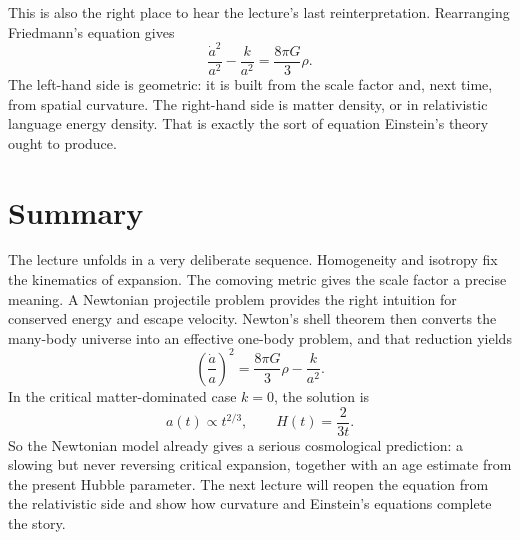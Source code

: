 This is also the right place to hear the lecture's last reinterpretation. Rearranging Friedmann's equation gives
\begin{equation}
\frac{\dot a^2}{a^2}-\frac{k}{a^2}=\frac{8\pi G}{3}\rho.
\end{equation}
The left-hand side is geometric: it is built from the scale factor and, next time, from spatial curvature. The right-hand side is matter density, or in relativistic language energy density. That is exactly the sort of equation Einstein's theory ought to produce.

\section{Summary}

The lecture unfolds in a very deliberate sequence. Homogeneity and isotropy fix the kinematics of expansion. The comoving metric gives the scale factor a precise meaning. A Newtonian projectile problem provides the right intuition for conserved energy and escape velocity. Newton's shell theorem then converts the many-body universe into an effective one-body problem, and that reduction yields
\begin{equation}
\left(\frac{\dot a}{a}\right)^2=\frac{8\pi G}{3}\rho-\frac{k}{a^2}.
\end{equation}
In the critical matter-dominated case \(k=0\), the solution is
\begin{equation}
a(t)\propto t^{2/3}, \qquad H(t)=\frac{2}{3t}.
\end{equation}
So the Newtonian model already gives a serious cosmological prediction: a slowing but never reversing critical expansion, together with an age estimate from the present Hubble parameter. The next lecture will reopen the equation from the relativistic side and show how curvature and Einstein's equations complete the story.